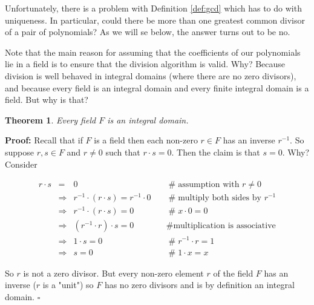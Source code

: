 \documentclass[11pt, oneside]{article}   	%
\newtheorem{thm}{Theorem}[section]
\theoremstyle{definition}
\begin{document}
\noindent
Unfortunately, there is a problem with Definition \ref{def:gcd} which has to do with uniqueness. In particular, could there be more than one greatest common 
divisor of a pair of polynomials?  As we will se below, the answer turns out to be no.

\bigskip
\noindent
Note that the main reason for assuming that the coefficients of our polynomials lie in a field is to ensure that the division algorithm is valid. Why?
Because division is well behaved in integral domains (where there are no zero divisors), and because every field is an integral domain and every finite 
integral domain is a field. But why is that?

\begin{thm}
Every field $F$ is an integral domain.
\label{thm:integral_domain}
\end{thm}

\noindent
\textbf{Proof:} Recall that if $F$ is a field then each non-zero $r \in F$ has an inverse $r^{-1}$. 
So suppose $r,s \in F$ and $r \neq 0$ such that $r \cdot s = 0$. Then the claim is that $s = 0$.
Why? Consider


\begin{equation}
\begin{array}{rcll} 
r \cdot s 
&=& 0                                                                                &\quad  \mathrel{\#} \text{assumption with $r \neq 0$}         \\
&\Rightarrow& r^{-1} \cdot (r \cdot s) = r^{-1} \cdot 0        &\quad  \mathrel{\#} \text{multiply both sides by $r^{-1}$}    \\
&\Rightarrow&  r^{-1} \cdot (r \cdot s) =  0                        &\quad  \mathrel{\#} x \cdot 0 = 0                                          \\
&\Rightarrow&  (r^{-1} \cdot r) \cdot s =  0                        &\quad  \mathrel{\#} \text{multiplication is associative}         \\
&\Rightarrow&  1 \cdot s = 0                                             &\quad  \mathrel{\#} r^{-1} \cdot r = 1                                   \\
&\Rightarrow&  s = 0                                                         &\quad  \mathrel{\#} 1 \cdot x = x
\end{array}
\end{equation}

\bigskip
\noindent
So $r$ is not a zero divisor. But every non-zero element $r$ of the field $F$ has an inverse ($r$ is a "unit")
so $F$ has no zero divisors and is by definition an integral 
domain. $\square$
\end{document}

